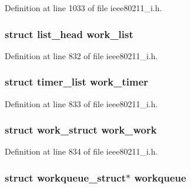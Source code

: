 Definition at line 1033 of file ieee80211\-\_\-i.\-h.

\hypertarget{structieee80211__local_a207d91b6483b2be61984ad3a064dbeb9}{
\subsubsection[{work\-\_\-list}]{\setlength{\rightskip}{0pt plus 5cm}struct list\-\_\-head work\-\_\-list}}\label{structieee80211__local_a207d91b6483b2be61984ad3a064dbeb9}


Definition at line 832 of file ieee80211\-\_\-i.\-h.

\hypertarget{structieee80211__local_a8a02d2a35aae73440084c24cb79a57af}{
\subsubsection[{work\-\_\-timer}]{\setlength{\rightskip}{0pt plus 5cm}struct timer\-\_\-list work\-\_\-timer}}\label{structieee80211__local_a8a02d2a35aae73440084c24cb79a57af}


Definition at line 833 of file ieee80211\-\_\-i.\-h.

\hypertarget{structieee80211__local_a5c4560ff0f9e5c23485f07405ea29b34}{
\subsubsection[{work\-\_\-work}]{\setlength{\rightskip}{0pt plus 5cm}struct work\-\_\-struct work\-\_\-work}}\label{structieee80211__local_a5c4560ff0f9e5c23485f07405ea29b34}


Definition at line 834 of file ieee80211\-\_\-i.\-h.

\hypertarget{structieee80211__local_a5ed2da065662e4534cb5bec3437a1876}{
\subsubsection[{workqueue}]{\setlength{\rightskip}{0pt plus 5cm}struct workqueue\-\_\-struct$\ast$ workqueue}}\label{structieee80211__local_a5ed2da065662e4534cb5bec3437a1876}


